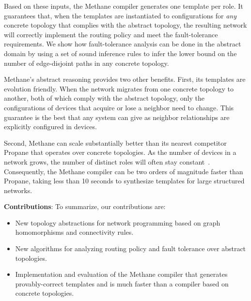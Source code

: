 \documentclass[numbers, 10pt, preprint]{sigplanconf}
\newcommand{\todo}[1]{\textcolor{red}{[TODO: #1]}}
\newcommand{\sysname}{{\small \sf Methane}\xspace}
\newcommand{\propane}{{\small \sf Propane}\xspace}
\begin{document}
Based on these inputs, the \sysname compiler generates one template per role. It
guarantees that, when the templates are instantiated to configurations for {\em
any} concrete topology that complies with the abstract topology, the resulting
network will correctly implement the routing policy and meet the fault-tolerance
requirements. We show how fault-tolerance analysis can be done in the abstract domain by using a set of sound inference rules to infer the lower bound on the number of edge-disjoint paths in any concrete topology.

\sysname's abstract reasoning provides two other benefits. First, its templates are evolution friendly. When the network migrates from
one concrete topology to another, both of which comply with the abstract
topology, only the configurations of devices that acquire or lose a neighbor need to change. This guarantee is the best that any system can give as neighbor relationships are explicitly configured in devices.

Second, \sysname can scale substantially better than its nearest competitor \propane that operates over concrete topologies. As the number of devices in a
network grows, the number of distinct roles will often stay constant~\cite{surgery}.
Consequently, the \sysname compiler can be two orders of magnitude
faster than \propane, taking less than 10 seconds to synthesize templates for large structured networks.



\vspace{1em}
\noindent
\textbf{Contributions}: To summarize, our contributions are:
%
\begin{itemize}[noitemsep,nolistsep,label={\large\textbullet}]
\item New topology abstractions for network programming
based on graph homomorphisms and connectivity rules.
\item New algorithms for analyzing routing policy and fault tolerance over
abstract topologies.
\item Implementation and evaluation of the \sysname compiler that generates
provably-correct templates and is much faster
than a compiler based on concrete topologies.
\end{itemize}
\end{document}
